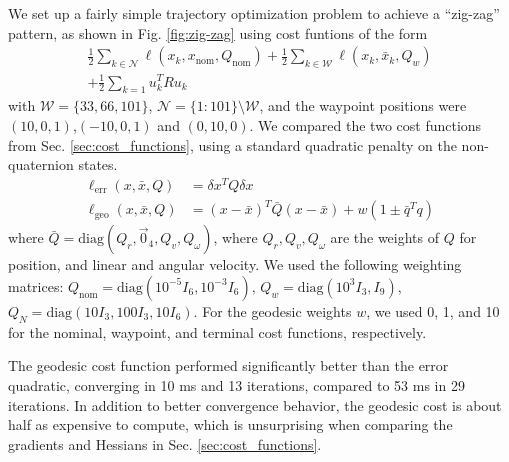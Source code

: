 \documentclass[letterpaper, 10 pt, conference]{ieeeconf}  %
\newcommand{\half}{\frac{1}{2}}
\begin{document}
        We set up a fairly simple trajectory optimization problem to achieve a
        ``zig-zag'' pattern, as shown in Fig. \ref{fig:zig-zag} using cost funtions of
        the form
        \begin{multline}
                  \half \sum_{k \in \mathcal{N}} \ell(x_k, x_\text{nom}, Q_\text{nom}) 
                + \half \sum_{k \in \mathcal{W}} \ell(x_k, \bar{x}_k, Q_w) \\
                + \half \sum_{k=1} u_k^T R u_k
        \end{multline}
        with $\mathcal{W} = \{33,66,101\}$, $\mathcal{N} = \{1:101\} \setminus
        \mathcal{W}$, and the waypoint positions were $(10,0,1)$,$(-10,0,1)$ and
        $(0,10,0)$. We compared the two cost functions from Sec.
        \ref{sec:cost_functions}, using a standard quadratic penalty on the
        non-quaternion states.
        \begin{align}
            \ell_\text{err}(x, \bar{x}, Q) &= \delta x^T Q \delta x \\ 
            \ell_\text{geo}(x, \bar{x}, Q) &= (x-\bar{x})^T \bar{Q} (x-\bar{x}) + w (1
                \pm \bar{q}^T q)
        \end{align}
        where $\bar{Q} = \text{diag}(Q_r, \vec{0}_4, Q_v, Q_\omega)$, where
        $Q_r,Q_v,Q_\omega$ are the weights of $Q$ for position, and linear and angular
        velocity.
        We used the following weighting matrices: 
        $Q_\text{nom} = \text{diag}(10^{-5} I_6,10^{-3} I_6)$, 
        $Q_w = \text{diag}(10^3 I_3,I_9)$, 
        $Q_N = \text{diag}(10 I_3, 100 I_3, 10 I_6)$.
        For the geodesic weights $w$, we used 0, 1, and 10 for the nominal, waypoint, and
        terminal cost functions, respectively.
        
        The geodesic cost function performed significantly better than the error
        quadratic, converging in 10 ms and 13 iterations, compared to 53 ms in 29
        iterations. In addition to better convergence behavior, the geodesic cost is
        about half as expensive to compute, which is unsurprising when comparing the
        gradients and Hessians in Sec. \ref{sec:cost_functions}.
\end{document}
